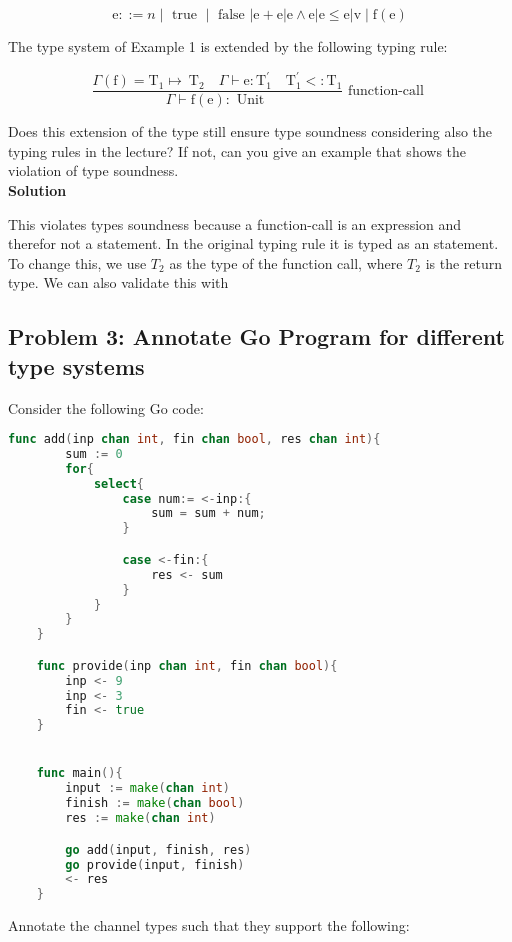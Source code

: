 \[
\mathrm{e}::=n \mid \text { true } \mid \text { false }|\mathrm{e}+\mathrm{e}| \mathrm{e} \wedge \mathrm{e}|\mathrm{e} \leq \mathrm{e}| \mathrm{v} \mid \mathrm{f}(\mathrm{e})
\]

The type system of Example 1 is extended by the following typing rule:

\[
\frac{\Gamma(\mathrm{f})=\mathrm{T}_1 \mapsto \mathrm{~T}_2 \quad \Gamma \vdash \mathrm{e}: \mathrm{T}_1^{\prime} \quad \mathrm{T}_1^{\prime}<: \mathrm{T}_1}{\Gamma \vdash \mathrm{f}(\mathrm{e}): \text { Unit }} \text { function-call }
\]

Does this extension of the type still ensure type soundness considering also the typing rules in the lecture? 
If not, can you give an example that shows the violation of type soundness. \\


\textbf{Solution}

This violates types soundness because a function-call is an expression and therefor not a statement. In the original typing rule it is typed as an statement.
To change this, we use $T_2$ as the type of the function call, where $T_2$ is the return type. 
We can also validate this with 


\subsection{Problem 3: Annotate Go Program for different type systems}

Consider the following Go code: 

\begin{lstlisting}[language=go]
    func add(inp chan int, fin chan bool, res chan int){
        sum := 0
        for{
            select{
                case num:= <-inp:{
                    sum = sum + num; 
                }

                case <-fin:{
                    res <- sum
                }
            }
        }
    }

    func provide(inp chan int, fin chan bool){
        inp <- 9
        inp <- 3
        fin <- true
    }


    func main(){
        input := make(chan int)
        finish := make(chan bool)
        res := make(chan int)

        go add(input, finish, res)
        go provide(input, finish)
        <- res
    }
\end{lstlisting}


Annotate the channel types such that they support the following: 

